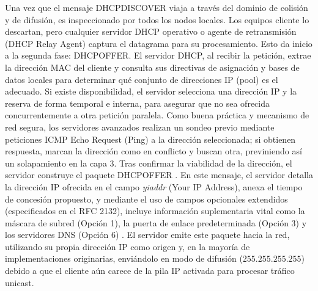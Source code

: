 \documentclass[a4paper,12pt]{article}
\begin{document}
Una vez que el mensaje DHCPDISCOVER viaja a través del dominio de colisión y de difusión, es inspeccionado por todos los nodos locales. Los equipos cliente lo descartan, pero cualquier servidor DHCP operativo o agente de retransmisión (DHCP Relay Agent) captura el datagrama para su procesamiento. Esto da inicio a la segunda fase: DHCPOFFER. El servidor DHCP, al recibir la petición, extrae la dirección MAC del cliente y consulta sus directivas de asignación y bases de datos locales para determinar qué conjunto de direcciones IP (pool) es el adecuado. Si existe disponibilidad, el servidor selecciona una dirección IP y la reserva de forma temporal e interna, para asegurar que no sea ofrecida concurrentemente a otra petición paralela. Como buena práctica y mecanismo de red segura, los servidores avanzados realizan un sondeo previo mediante peticiones ICMP Echo Request (Ping) a la dirección seleccionada; si obtienen respuesta, marcan la dirección como en conflicto y buscan otra, previniendo así un solapamiento en la capa 3. Tras confirmar la viabilidad de la dirección, el servidor construye el paquete DHCPOFFER \cite{microsoft_dhcp}. En este mensaje, el servidor detalla la dirección IP ofrecida en el campo \textit{yiaddr} (Your IP Address), anexa el tiempo de concesión propuesto, y mediante el uso de campos opcionales extendidos (especificados en el RFC 2132), incluye información suplementaria vital como la máscara de subred (Opción 1), la puerta de enlace predeterminada (Opción 3) y los servidores DNS (Opción 6) \cite{rfc2131}. El servidor emite este paquete hacia la red, utilizando su propia dirección IP como origen y, en la mayoría de implementaciones originarias, enviándolo en modo de difusión ($255.255.255.255$) debido a que el cliente aún carece de la pila IP activada para procesar tráfico unicast.
\end{document}
